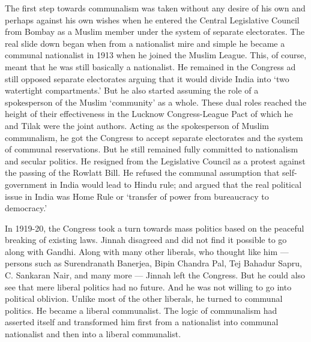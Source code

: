 The first step towards communalism was taken without any desire of his own and perhaps against his own wishes when he entered the Central Legislative Council from Bombay as a Muslim member under the system of separate electorates. The real slide down began when from a nationalist mire and simple he became a communal nationalist in 1913 when he joined the Muslim League. This, of course, meant that he was still basically a nationalist. He remained in the Congress ad still opposed separate electorates arguing that it would divide India into ‘two watertight compartments.’ But he also started assuming the role of a spokesperson of the Muslim ‘community’ as a whole. These dual roles reached the height of their effectiveness in the Lucknow Congress-League Pact of which he and Tilak were the joint authors. Acting as the spokesperson of Muslim communalism, he got the Congress to accept separate electorates and the system of communal reservations. But he still remained fully committed to nationalism and secular politics. He resigned from the Legislative Council as a protest against the passing of the Rowlatt Bill. He refused the communal assumption that self- government in India would lead to Hindu rule; and argued that the real political issue in India was Home Rule or ‘transfer of power from bureaucracy to democracy.’ 

In 1919-20, the Congress took a turn towards mass politics based on the peaceful breaking of existing laws. Jinnah disagreed and did not find it possible to go along with Gandhi. Along with many other liberals, who thought like him — persons such as Surendranath Banerjea, Bipin Chandra Pal, Tej Bahadur Sapru, C. Sankaran Nair, and many more — Jinnah left the Congress. But he could also see that mere liberal politics had no future. And he was not willing to go into political oblivion. Unlike most of the other liberals, he turned to communal politics. He became a liberal communalist. The logic of communalism had asserted itself and transformed him first from a nationalist into communal nationalist and then into a liberal communalist. 

